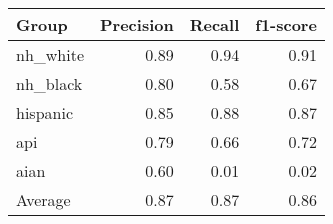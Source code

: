 \begin{tabular}{lrrr}
    \toprule
    Group     & Precision & Recall & f1-score \\
    \midrule
    nh\_white & 0.89      & 0.94   & 0.91     \\
    nh\_black & 0.80      & 0.58   & 0.67     \\
    hispanic  & 0.85      & 0.88   & 0.87     \\
    api       & 0.79      & 0.66   & 0.72     \\
    aian      & 0.60      & 0.01   & 0.02     \\
    \midrule
    Average  & 0.87      & 0.87   & 0.86     \\
    \bottomrule
\end{tabular}

